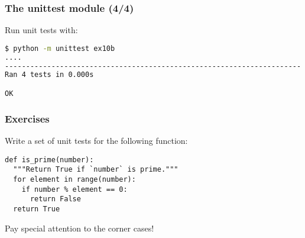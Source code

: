 \begin{frame}[fragile]
\frametitle{The unittest module (4/4)}
Run unit tests with:
  \begin{lstlisting}[language=sh]
$ python -m unittest ex10b
....
----------------------------------------------------------------------
Ran 4 tests in 0.000s

OK
\end{lstlisting}
\end{frame}

\begin{frame}[fragile]\frametitle{Exercises}
    Write a set of unit tests for the following function:
\begin{lstlisting}
def is_prime(number):
  """Return True if `number` is prime."""
  for element in range(number):
    if number % element == 0:
      return False
  return True
\end{lstlisting}
    Pay special attention to the corner cases!
\end{frame}
